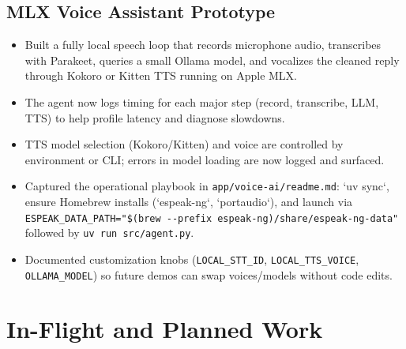 \documentclass[11pt]{article}
\begin{document}
\subsection{MLX Voice Assistant Prototype}
\begin{itemize}[leftmargin=*]
\item Built a fully local speech loop that records microphone audio,
    transcribes with Parakeet, queries a small Ollama model, and vocalizes
    the cleaned reply through Kokoro or Kitten TTS running on Apple MLX.
\item The agent now logs timing for each major step (record, transcribe, LLM, TTS) to help profile latency and diagnose slowdowns.
\item TTS model selection (Kokoro/Kitten) and voice are controlled by environment or CLI; errors in model loading are now logged and surfaced.
\item Captured the operational playbook in
    \texttt{app/voice-ai/readme.md}: `uv sync`, ensure Homebrew installs
    (`espeak-ng`, `portaudio`), and launch via
    \verb|ESPEAK_DATA_PATH="$(brew --prefix espeak-ng)/share/espeak-ng-data"|
    followed by \texttt{uv run src/agent.py}.
\item Documented customization knobs (\texttt{LOCAL\_STT\_ID},
    \texttt{LOCAL\_TTS\_VOICE}, \texttt{OLLAMA\_MODEL}) so future demos
    can swap voices/models without code edits.
\end{itemize}

\section{In-Flight and Planned Work}
\end{document}
